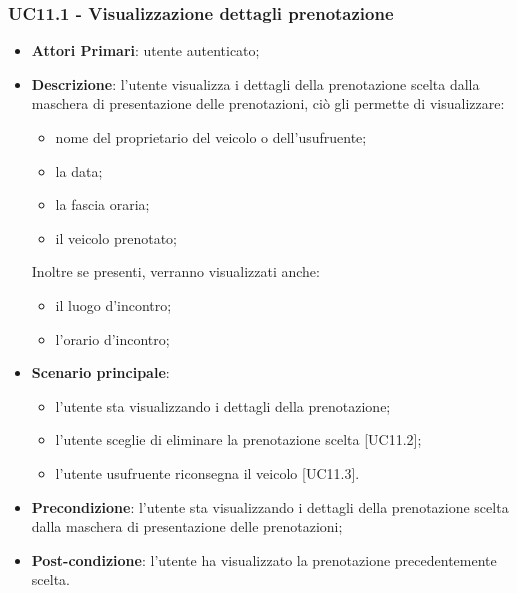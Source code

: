  \subsubsection{UC11.1 - Visualizzazione dettagli prenotazione}
\begin{itemize}
	\item \textbf{Attori Primari}: utente autenticato;
	\item \textbf{Descrizione}: l'utente visualizza i dettagli della prenotazione scelta dalla maschera di presentazione delle prenotazioni, ciò gli permette di visualizzare:
	\begin{itemize}
		\item nome del proprietario del veicolo o dell'usufruente;
		\item la data;
		\item la fascia oraria;
		\item il veicolo prenotato;
	\end{itemize}
	Inoltre se presenti, verranno visualizzati anche:
	\begin{itemize}		
		\item il luogo d'incontro;
		\item l'orario d'incontro;
	\end{itemize}
	\item \textbf{Scenario principale}:
	\begin{itemize}
		\item l'utente sta visualizzando i dettagli della prenotazione;
		\item l'utente sceglie di eliminare la prenotazione scelta [UC11.2];
		\item l'utente usufruente riconsegna il veicolo [UC11.3].
	\end{itemize}
	\item \textbf{Precondizione}: l'utente sta visualizzando i dettagli della prenotazione scelta dalla maschera di presentazione delle prenotazioni;
	\item \textbf{Post-condizione}: l'utente ha visualizzato la prenotazione precedentemente scelta.
\end{itemize}


